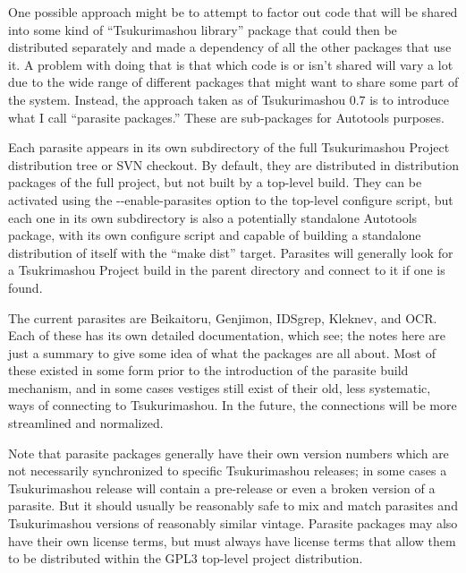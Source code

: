 \documentclass[14pt]{extarticle}
\begin{document}
One possible approach might be to attempt to factor out code that will be
shared into some kind of ``Tsukurimashou library'' package that could then
be distributed separately and made a dependency of all the other packages
that use it.  A problem with doing that is that which code is or isn't
shared will vary a lot due to the wide range of different packages that
might want to share some part of the system.  Instead, the approach taken as
of Tsukurimashou 0.7 is to introduce what I call ``parasite packages.''
These are sub-packages for Autotools purposes.

Each parasite appears in its own subdirectory of the full Tsukurimashou
Project distribution tree or SVN checkout.  By default, they are distributed
in distribution packages of the full project, but not built by a top-level
build.  They can be activated using the -{}-enable-parasites option to the
top-level configure script, but each one in its own subdirectory is also a
potentially standalone Autotools package, with its own configure script and
capable of building a standalone distribution of itself with the ``make
dist'' target.  Parasites will generally look for a Tsukrimashou Project
build in the parent directory and connect to it if one is found.

The current parasites are Beikaitoru, Genjimon, IDSgrep, Kleknev, and OCR. 
Each of these has its own detailed documentation, which see; the notes here
are just a summary to give some idea of what the packages are all about. 
Most of these existed in some form prior to the introduction of the parasite
build mechanism, and in some cases vestiges still exist of their old, less
systematic, ways of connecting to Tsukurimashou.  In the future, the
connections will be more streamlined and normalized.

Note that parasite packages generally have their own version numbers which
are not necessarily synchronized to specific Tsukurimashou releases; in some
cases a Tsukurimashou release will contain a pre-release or even a broken
version of a parasite.  But it should usually be reasonably safe to mix and
match parasites and Tsukurimashou versions of reasonably similar vintage. 
Parasite packages may also have their own license terms, but must always
have license terms that allow them to be distributed within the GPL3
top-level project distribution.
\end{document}
